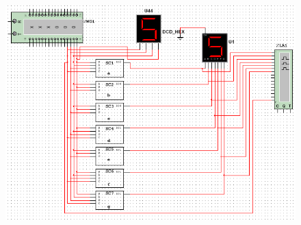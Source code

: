 \documentclass[12pt,a4paper]{article}
\begin{document}
\begin{figure}[H]
\centering
\includegraphics[width=\textwidth]{7seg/7segall}
\end{figure}
\end{document}
